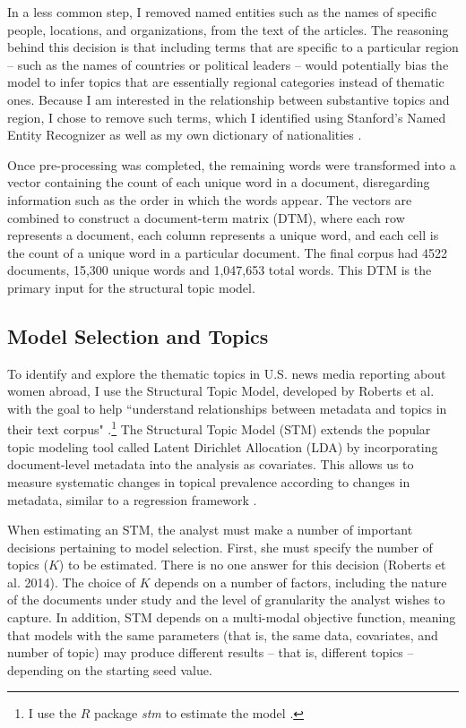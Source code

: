 \documentclass[11pt, oneside]{article}
\begin{document}
In a less common step, I removed named entities such as the names of specific people, locations, and organizations, from the text of the articles. The reasoning behind this decision is that including terms that are specific to a particular region -- such as the names of countries or political leaders -- would potentially bias the model to infer topics that are essentially regional categories instead of thematic ones. Because I am interested in the relationship between substantive topics and region, I chose to remove such terms, which I identified using Stanford's Named Entity Recognizer as well as my own dictionary of nationalities \cite{finkel2005incorporating}.

Once pre-processing was completed, the remaining words were transformed into a vector containing the count of each unique word in a document, disregarding information such as the order in which the words appear.  The vectors are combined to construct a document-term matrix (DTM), where each row represents a document, each column represents a unique word, and each cell is the count of a unique word in a particular document. The final corpus had 4522 documents, 15,300 unique words and 1,047,653 total words. This DTM is the primary input for the structural topic model. 
	
\subsection{Model Selection and Topics}

To identify and explore the thematic topics in U.S. news media reporting about women abroad, I use the Structural Topic Model, developed by Roberts et al. \cite{roberts2013structural} with the goal to help ``understand relationships between metadata and topics in their text corpus" \cite[p. 2]{lucas2015computer}.\footnote{\hspace{5}I use the $R$ package \emph{stm} to estimate the model \cite{roberts2014stm}.} The Structural Topic Model (STM) extends the popular topic modeling tool called Latent Dirichlet Allocation (LDA) by incorporating document-level metadata into the analysis as covariates. This allows us to measure systematic changes in topical prevalence according to changes in metadata, similar to a regression framework \cite[p. 5]{roberts2014}.

When estimating an STM, the analyst must make a number of important decisions pertaining to model selection. First, she must specify the number of topics ($K$) to be estimated. There is no one answer for this decision (Roberts et al. 2014). The choice of $K$ depends on a number of factors, including the nature of the documents under study and the level of granularity the analyst wishes to capture. In addition, STM depends on a multi-modal objective function, meaning that models with the same parameters (that is, the same data, covariates, and number of topic) may produce different results -- that is, different topics -- depending on the starting seed value.
\end{document}
